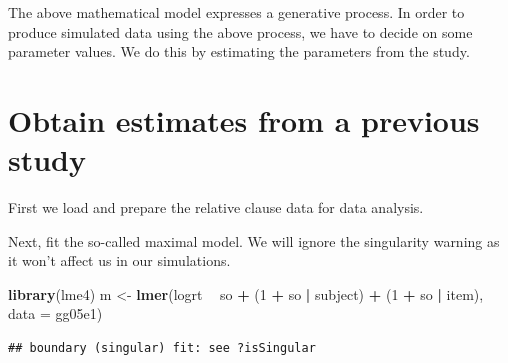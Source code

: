 \documentclass[12pt,]{krantz}
\newenvironment{Shaded}{\begin{snugshade}}{\end{snugshade}}
\newcommand{\DataTypeTok}[1]{\textcolor[rgb]{0.13,0.29,0.53}{#1}}
\newcommand{\DecValTok}[1]{\textcolor[rgb]{0.00,0.00,0.81}{#1}}
\newcommand{\KeywordTok}[1]{\textcolor[rgb]{0.13,0.29,0.53}{\textbf{#1}}}
\newcommand{\NormalTok}[1]{#1}
\newcommand{\OperatorTok}[1]{\textcolor[rgb]{0.81,0.36,0.00}{\textbf{#1}}}
\newcommand{\OtherTok}[1]{\textcolor[rgb]{0.56,0.35,0.01}{#1}}
\newcommand{\StringTok}[1]{\textcolor[rgb]{0.31,0.60,0.02}{#1}}
\begin{document}
The above mathematical model expresses a generative process. In order to produce simulated data using the above process, we have to decide on some parameter values. We do this by estimating the parameters from the \citet{grodner} study.

\hypertarget{obtain-estimates-from-a-previous-study}{%
\section{Obtain estimates from a previous study}\label{obtain-estimates-from-a-previous-study}}

First we load and prepare the relative clause data for data analysis.

\begin{Shaded}
\end{Shaded}

Next, fit the so-called maximal model. We will ignore the singularity warning as it won't affect us in our simulations.

\begin{Shaded}
\begin{Highlighting}[]
\KeywordTok{library}\NormalTok{(lme4)}
\NormalTok{m <-}\StringTok{ }\KeywordTok{lmer}\NormalTok{(logrt }\OperatorTok{~}\StringTok{ }\NormalTok{so }\OperatorTok{+}\StringTok{ }\NormalTok{(}\DecValTok{1} \OperatorTok{+}\StringTok{ }\NormalTok{so }\OperatorTok{|}\StringTok{ }\NormalTok{subject) }\OperatorTok{+}\StringTok{ }
\StringTok{  }\NormalTok{(}\DecValTok{1} \OperatorTok{+}\StringTok{ }\NormalTok{so }\OperatorTok{|}\StringTok{ }\NormalTok{item), }\DataTypeTok{data =}\NormalTok{ gg05e1)}
\end{Highlighting}
\end{Shaded}

\begin{verbatim}
## boundary (singular) fit: see ?isSingular
\end{verbatim}
\end{document}
